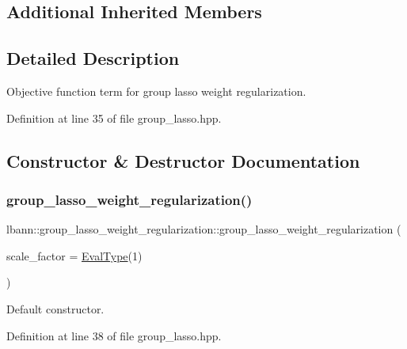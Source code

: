 \subsection*{Additional Inherited Members}


\subsection{Detailed Description}
Objective function term for group lasso weight regularization. 

Definition at line 35 of file group\+\_\+lasso.\+hpp.



\subsection{Constructor \& Destructor Documentation}
\mbox{\label{classlbann_1_1group__lasso__weight__regularization_a6ffca49b19d4adbff300a229ef85ac3b}} 
\subsubsection{\texorpdfstring{group\+\_\+lasso\+\_\+weight\+\_\+regularization()}{group\_lasso\_weight\_regularization()}\hspace{0.1cm}{\footnotesize\ttfamily [1/2]}}
{\footnotesize\ttfamily lbann\+::group\+\_\+lasso\+\_\+weight\+\_\+regularization\+::group\+\_\+lasso\+\_\+weight\+\_\+regularization (\begin{DoxyParamCaption}\item[{\hyperlink{base_8hpp_a3266f5ac18504bbadea983c109566867}{Eval\+Type}}]{scale\+\_\+factor = {\ttfamily \hyperlink{base_8hpp_a3266f5ac18504bbadea983c109566867}{Eval\+Type}(1)} }\end{DoxyParamCaption})\hspace{0.3cm}{\ttfamily [inline]}}

Default constructor. 

Definition at line 38 of file group\+\_\+lasso.\+hpp.


